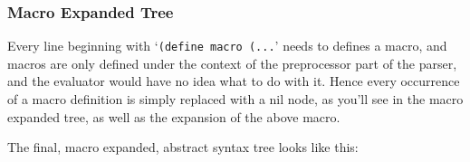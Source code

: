 \documentclass{article}
\newcommand{\code}[1]{\texttt{#1}}
\begin{document}
    \clearpage

    \subsubsection{Macro Expanded Tree}
      Every line beginning with `\code{(define macro (...}' needs to defines a
      macro, and macros are only defined under the context of the preprocessor
      part of the parser, and the evaluator would have no idea what to do with it.
      Hence every occurrence of a macro definition is simply replaced with a nil
      node, as you'll see in the macro expanded tree, as well as the expansion of
      the above macro.

      \clearpage

      The final, macro expanded, abstract syntax tree looks like this:
\end{document}
